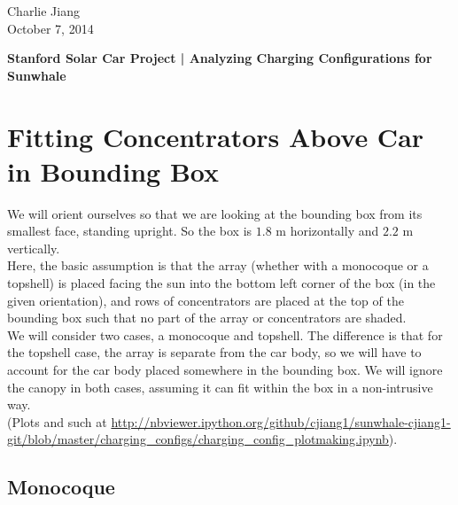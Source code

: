 \documentclass[reqno, 11pt, final]{article}
\begin{document}
\begin{flushright}
Charlie Jiang \\
October 7, 2014
\\[12pt]
\end{flushright}

\textbf{Stanford Solar Car Project | Analyzing Charging Configurations for Sunwhale} \\
\renewcommand{\baselinestretch}{1.1} %

\section{Fitting Concentrators Above Car in Bounding Box}

We will orient ourselves so that we are looking at the bounding box from its smallest face, standing upright. So the box is $1.8$ m horizontally and $2.2$ m vertically. \\

Here, the basic assumption is that the array (whether with a monocoque or a topshell) is placed facing the sun into the bottom left corner of the box (in the given orientation), and rows of concentrators are placed at the top of the bounding box such that no part of the array or concentrators are shaded. \\

We will consider two cases, a monocoque and topshell. The difference is that for the topshell case, the array is separate from the car body, so we will have to account for the car body placed somewhere in the bounding box. We will ignore the canopy in both cases, assuming it can fit within the box in a non-intrusive way. \\

(Plots and such at \url{http://nbviewer.ipython.org/github/cjiang1/sunwhale-cjiang1-git/blob/master/charging_configs/charging_config_plotmaking.ipynb}).

\subsection{Monocoque}
\end{document}
